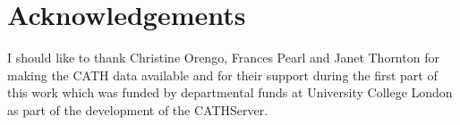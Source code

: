 \documentclass{article}
\begin{document}


\section{Acknowledgements}
I should like to thank Christine Orengo, Frances Pearl and Janet
Thornton for making the CATH data available and for their support
during the first part of this work which was funded by departmental
funds at University College London as part of the development of the
CATHServer.


\end{document}
